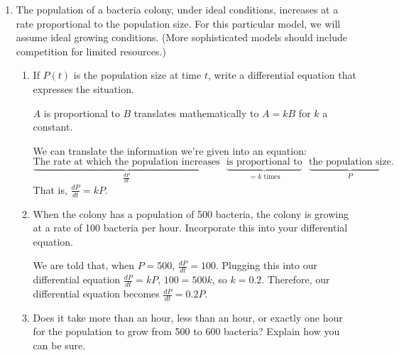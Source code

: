 \documentclass[main]{subfiles}
\begin{document}
\begin{enumerate}
\item  \label{diffeq-modeling-bacteria-1}

  The population of a bacteria colony, under ideal conditions, increases at a rate proportional to
  the population size. For this particular model, we will assume ideal growing conditions. (More sophisticated models should include competition for limited resources.)
  \begin{enumerate}
  \item
    \begin{problem}[0.5in]
      If $P(t)$ is the population size at time $t$, write a differential
      equation that expresses the situation.      
    \end{problem}

  \begin{framed}
     {$A$ is proportional to $B$} translates mathematically to $A = kB$ for $k$ a constant.
  \end{framed}
    \begin{solution}
      We can translate the information we're given into an equation: 
      \[ \underbrace{\text{The rate at which the population
          increases}}_{\frac{dP}{dt}} \text{ } \underbrace{\text{is
          proportional to}}_{{} = k \text{ times}} \text{ }
      \underbrace{\text{the population size}}_{P}.\] That is,
      $\boxed{\frac{dP}{dt} = k P}$. 
    \end{solution}

  \item
    \begin{problem}[0.4in]
      When the colony has a population of 500 bacteria, the colony is
      growing at a rate of 100 bacteria per hour.  Incorporate this into
      your differential equation.
    \end{problem}

    \begin{solution}
      We are told that, when $P = 500$, $\frac{dP}{dt} = 100$.  Plugging
      this into our differential equation $\frac{dP}{dt} = kP$, $100 = 500
      k$, so $k = 0.2$.  Therefore, our differential equation becomes
      $\boxed{\frac{dP}{dt} = 0.2 P}$.
    \end{solution}
\item
    \begin{problem}[\vfill]
      Does it take more than an hour, less than an hour, or exactly one
      hour for the population to grow from 500 to 600 bacteria?  Explain
      how you can be sure.
    \end{problem}


\end{enumerate}
\end{enumerate}
\end{document}
